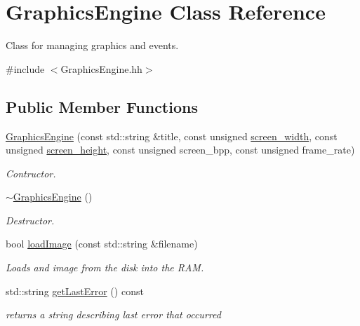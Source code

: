\hypertarget{classGraphicsEngine}{\section{Graphics\-Engine Class Reference}
\label{classGraphicsEngine}
}


Class for managing graphics and events.  




{\ttfamily \#include $<$Graphics\-Engine.\-hh$>$}

\subsection*{Public Member Functions}
\begin{DoxyCompactItemize}
\item 
\hyperlink{classGraphicsEngine_afb12af77895e3bbb57e6d46a36ba3974}{Graphics\-Engine} (const std\-::string \&title, const unsigned \hyperlink{classGraphicsEngine_a7598618ef7de1ba7813e41471938f2c1}{screen\-\_\-width}, const unsigned \hyperlink{classGraphicsEngine_af7d7440d76fda157dae03aabc9388a83}{screen\-\_\-height}, const unsigned screen\-\_\-bpp, const unsigned frame\-\_\-rate)
\begin{DoxyCompactList}\small\item\em Contructor. \end{DoxyCompactList}\item 
\hyperlink{classGraphicsEngine_ab67afeefbc9f1c284f6ce310c31ae8f6}{$\sim$\-Graphics\-Engine} ()
\begin{DoxyCompactList}\small\item\em Destructor. \end{DoxyCompactList}\item 
bool \hyperlink{classGraphicsEngine_a2588ff40788701709e97107100e0a8f3}{load\-Image} (const std\-::string \&filename)
\begin{DoxyCompactList}\small\item\em Loads and image from the disk into the R\-A\-M. \end{DoxyCompactList}\item 
std\-::string \hyperlink{classGraphicsEngine_a0141ef903d368eedea2aaf6e47001efa}{get\-Last\-Error} () const 
\begin{DoxyCompactList}\small\item\em returns a string describing last error that occurred \end{DoxyCompactList}\item 

\end{DoxyCompactItemize}
